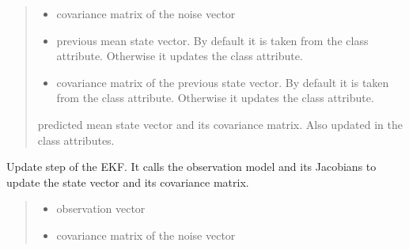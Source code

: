 \documentclass[letterpaper,10pt,english]{sphinxmanual}
\begin{document}
\begin{fulllineitems}
\begin{fulllineitems}
\begin{quote}
\begin{description}
\begin{itemize}
\item {} 
\sphinxAtStartPar
{} \textendash{} covariance matrix of the noise vector

\item {} 
\sphinxAtStartPar
{} \textendash{} previous mean state vector. By default it is taken from the class attribute. Otherwise it updates the class attribute.

\item {} 
\sphinxAtStartPar
{} \textendash{} covariance matrix of the previous state vector. By default it is taken from the class attribute. Otherwise it updates the class attribute.

\end{itemize}

\sphinxAtStartPar
predicted mean state vector and its covariance matrix. Also updated in the class attributes.

\end{description}\end{quote}

\end{fulllineitems}


\begin{fulllineitems}
\label{\detokenize{EKF:EKF.EKF.Update}}
\pysigstartsignatures
{}
\pysigstopsignatures
\sphinxAtStartPar
Update step of the EKF. It calls the observation model and its Jacobians to update the state vector and its covariance matrix.
\begin{quote}\begin{description}
\begin{itemize}
\item {} 
\sphinxAtStartPar
{} \textendash{} observation vector

\item {} 
\sphinxAtStartPar
{} \textendash{} covariance matrix of the noise vector


\end{itemize}
\end{description}
\end{quote}
\end{fulllineitems}
\end{fulllineitems}
\end{document}
